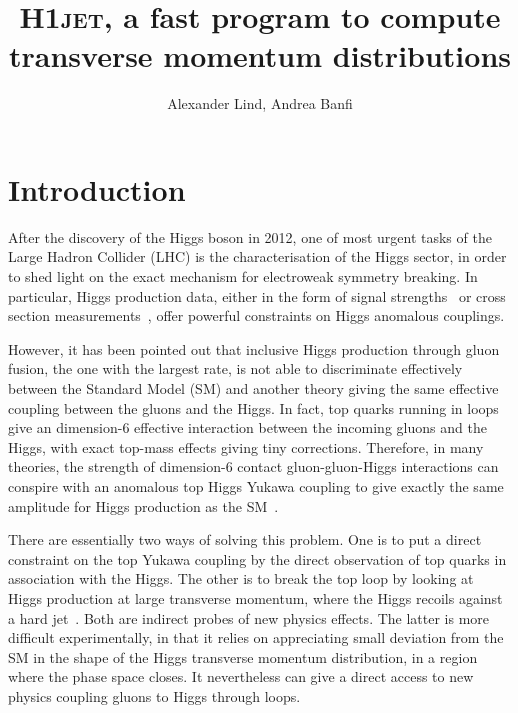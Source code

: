 \documentclass[12pt]{article}
\title{\textsc{H1jet}, a fast program to compute transverse momentum distributions}
\author{Alexander Lind, Andrea Banfi}
\begin{document}
\maketitle


\section{Introduction}
\label{sec:intro}

After the discovery of the Higgs boson in
2012\cite{Aad:2012tfa,Chatrchyan:2012ufa}, one of most urgent tasks of
the Large Hadron Collider (LHC) is the characterisation of the Higgs
sector, in order to shed light on the exact mechanism for electroweak
symmetry breaking. In particular, Higgs production data, either in the
form of signal strengths~\cite{Aad:2019mbh,Sirunyan:2018koj} or cross
section measurements~\cite{Aaboud:2018ezd,Sirunyan:2018sgc}, offer
powerful constraints on Higgs anomalous couplings.

However, it has been pointed out that inclusive Higgs production
through gluon fusion, the one with the largest rate, is not able to
discriminate effectively between the Standard Model (SM) and another
theory giving the same effective coupling between the gluons and the
Higgs. In fact, top quarks running in loops give an dimension-6
effective interaction between the incoming gluons and the Higgs, with
exact top-mass effects giving tiny corrections. Therefore, in many
theories, the strength of dimension-6 contact gluon-gluon-Higgs
interactions can conspire with an anomalous top Higgs Yukawa coupling
to give exactly the same amplitude for Higgs production as the
SM~\cite{Azatov:2013xha,Grojean:2013nya,Banfi:2013yoa}.

There are essentially two ways of solving this problem. One is to put
a direct constraint on the top Yukawa coupling by the direct
observation of top quarks in association with the
Higgs\cite{Aad:2020ivc,Sirunyan:2020sum,Maltoni:2016yxb}. The other is
to break the top loop by looking at Higgs production at large
transverse momentum, where the Higgs recoils against a hard
jet~\cite{Azatov:2013xha,Grojean:2013nya,Banfi:2013yoa}. Both are
indirect probes of new physics effects. The latter is more difficult
experimentally, in that it relies on appreciating small deviation from
the SM in the shape of the Higgs transverse momentum distribution, in
a region where the phase space closes. It nevertheless can give a
direct access to new physics coupling gluons to Higgs through loops.
\end{document}
